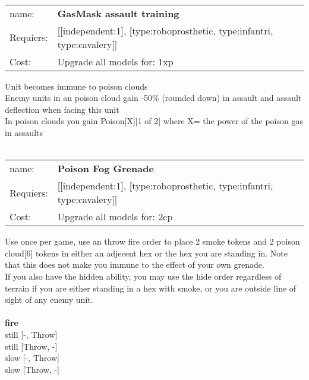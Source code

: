 \ \\
\begin{tabular}{ll}
name: & {\bf GasMask assault training } \\
Requiers: & [[independent:1], [type:roboprosthetic, type:infantri, type:cavalery]] \\
Cost: & Upgrade all models for: 1xp \\
\end{tabular}

Unit becomes immune to poison clouds\\ 
Enemy units in an poison cloud gain -50\% (rounded down) in assault and assault deflection when facing this unit\\ 
In poison clouds you gain Poison[X][1 of 2] where X= the power of the poison gas in assaults\\ 









\ \\
\begin{tabular}{ll}
name: & {\bf Poison Fog Grenade } \\
Requiers: & [[independent:1], [type:roboprosthetic, type:infantri, type:cavalery]] \\
Cost: & Upgrade all models for: 2cp \\
\end{tabular}

Use once per game, use an throw fire order to place 2 smoke tokens and 2 poison cloud[6] tokens in either an adjecent hex or the hex you are standing in. Note that this does not make you immune to the effect of your own grenade.\\ 
If you also have the hidden ability, you may use the hide order regardless of terrain if you are either standing in a hex with smoke, or you are outside line of sight of any enemy unit. \\ 








\ \\ {\bf fire } \\
still [-, Throw] \\
still [Throw, -] \\
slow [-, Throw] \\
slow [Throw, -] \\

